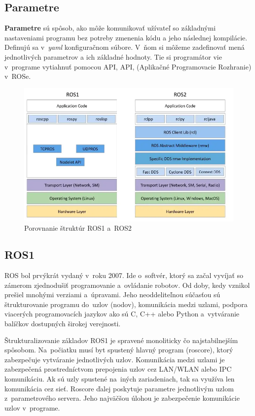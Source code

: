 \subsection{Parametre}

\label{s_parametre}
\textbf{Parametre} sú spôsob, ako môže komunikovať užívateľ so základnými nastaveniami programu bez potreby zmenenia kódu a jeho následnej kompilácie.
Definujú sa v~\textit{yaml} konfiguračnom súbore. V~ňom si môžeme zadefinovať mená jednotlivých parametrov a ich základné hodnoty. Tie si programátor
vie v~programe vytiahnuť pomocou API, \acrlong{API}, (Aplikačné Programovacie Rozhranie) v~ROSe.

\begin{figure}[!htbp]
	\centering
	\includegraphics[width=15cm]{img/strukturaRos1Ros2.png}
	\caption{Porovnanie štruktúr ROS1 a~ROS2~\cite{comparison}}
	\label{fig:struktury}
\end{figure}

\subsection{ROS1}

\noindent ROS bol prvýkrát vydaný v~roku 2007. Ide o~softvér, ktorý sa začal vyvíjať so zámerom zjednodušiť programovanie a~ovládanie robotov. Od doby,
kedy vznikol prešiel mnohými verziami a~úpravami. Jeho neoddeliteľnou súčasťou sú štrukturovanie programu do~uzlov (nodov), komunikácia medzi uzlami,
podpora viacerých programovacích jazykov ako sú C, C++ alebo Python a~vytváranie balíčkov dostupných širokej verejnosti.

Štrukturalizovanie základov ROS1 je spravené monoliticky čo najstabilnejším spôsobom. Na~počiatku musí byt spustený hlavný program (roscore),
ktorý zabezpečuje vytváranie jednotlivých uzlov. Komunikácia medzi uzlami je zabezpečená prostredníctvom prepojenia uzlov cez LAN/WLAN alebo IPC komunikáciu.
Ak sú uzly spustené na~iných zariadeniach, tak sa využíva len komunikácia cez sieť. Roscore ďalej poskytuje parametre jednotlivým uzlom z~parametrového
servera. Jeho najväčšou úlohou je zabezpečenie komunikácie uzlov v~programe.

